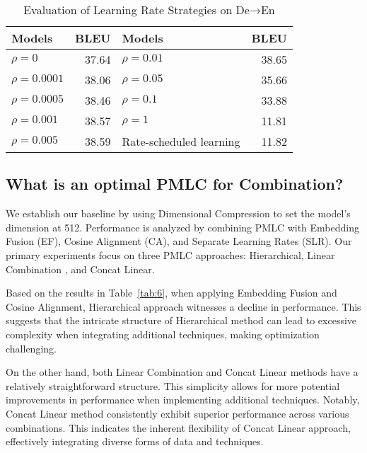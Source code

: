 \documentclass[conference]{IEEEtran}
\begin{document}
\begin{table}[!tb]
    \centering
    \caption{Evaluation of Learning Rate Strategies on De→En}
    \label{tab:5}
    \begin{tabular}{|l|r|l|r|}
        \hline
        \textbf{Models} & \textbf{BLEU} & \textbf{Models} & \textbf{BLEU} \\
        \hline
        \( \rho = 0 \)               & 37.64 & \( \rho = 0.01 \)                       & 38.65 \\
        \( \rho = 0.0001 \)         & 38.06 & \( \rho = 0.05 \)                       & 35.66 \\
        \( \rho = 0.0005 \)         & 38.46 & \( \rho = 0.1 \)                        & 33.88 \\
        \( \rho = 0.001 \)          & 38.57 & \( \rho = 1 \)                          & 11.81 \\
        \( \rho = 0.005 \)          & 38.59 & Rate-scheduled learning                 & 11.82 \\
        \hline
    \end{tabular}
\end{table}


\subsection{What is an optimal PMLC for Combination?}
We establish our baseline by using Dimensional Compression to set the model's dimension at 512. Performance is analyzed by combining PMLC with Embedding Fusion (EF), Cosine Alignment (CA), and Separate Learning Rates (SLR). Our primary experiments focus on three PMLC approaches: Hierarchical, Linear Combination \cite{dou2018exploiting}, and Concat Linear.

Based on the results in Table~\ref{tab:6}, when applying Embedding Fusion and Cosine Alignment, Hierarchical approach witnesses a decline in performance. This suggests that the intricate structure of Hierarchical method can lead to excessive complexity when integrating additional techniques, making optimization challenging.

On the other hand, both Linear Combination and Concat Linear methods have a relatively straightforward structure. This simplicity allows for more potential improvements in performance when implementing additional techniques. Notably, Concat Linear method consistently exhibit superior performance across various combinations. This indicates the inherent flexibility of Concat Linear approach, effectively integrating diverse forms of data and techniques.
\end{document}

